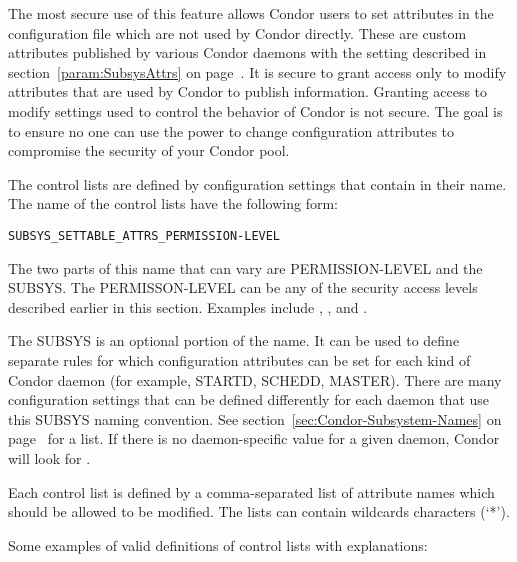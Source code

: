 The most secure use of this feature allows Condor users to set
attributes in the configuration file which are not used by Condor
directly.
These are custom attributes published by various Condor
daemons with the  setting described in
section~\ref{param:SubsysAttrs} on page~\pageref{param:SubsysAttrs}.
It is secure to grant access only to modify attributes that are used by Condor
to publish information.
Granting access to modify
settings used to control the behavior of Condor is
not secure.
The goal is to
ensure no
one can use the power to change configuration attributes to compromise 
the security of your Condor pool.

The control lists are defined by configuration settings that contain 
 in their name.
The name of the control lists have the following form: 

\footnotesize
\begin{verbatim}
SUBSYS_SETTABLE_ATTRS_PERMISSION-LEVEL
\end{verbatim}
\normalsize

The two parts of this name that can vary are
PERMISSION-LEVEL and the SUBSYS.
The PERMISSON-LEVEL can be any of the security access levels
described earlier in this section.
Examples include , , and .

The SUBSYS is an optional portion of the name. 
It can be used to
define separate rules for which configuration attributes can be set
for each kind of Condor daemon (for example, STARTD, SCHEDD, MASTER).
There are many configuration settings that can be defined differently
for each daemon that use this SUBSYS naming convention.
See section~\ref{sec:Condor-Subsystem-Names} on
page~\pageref{sec:Condor-Subsystem-Names} for a list.
If there is no daemon-specific value for a given daemon, Condor will
look for .

Each control list is defined by a comma-separated list of attribute
names which should be allowed to be modified.
The lists can contain wildcards characters (`*'). 

Some examples of valid definitions of control lists with explanations:

